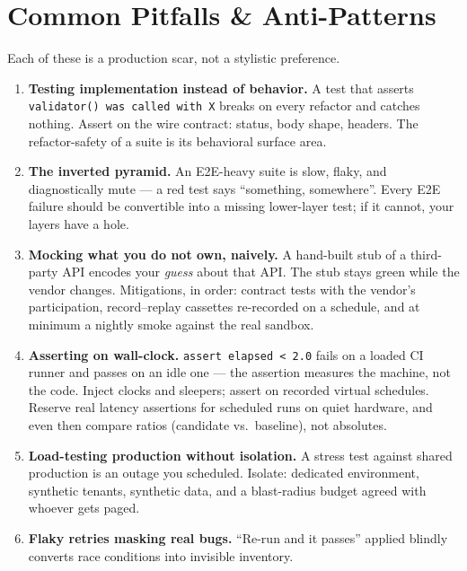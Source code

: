 \section{Common Pitfalls \& Anti-Patterns}
\label{sec:ch19-pitfalls}

Each of these is a production scar, not a stylistic preference.

\begin{enumerate}[label=\textbf{P-\arabic*.}, leftmargin=1.9cm]
  \item \textbf{Testing implementation instead of behavior.} A test that
        asserts \texttt{validator() was called with X} breaks on every
        refactor and catches nothing. Assert on the wire contract: status,
        body shape, headers. The refactor-safety of a suite is its
        behavioral surface area.
  \item \textbf{The inverted pyramid.} An E2E-heavy suite is slow, flaky,
        and diagnostically mute --- a red test says ``something, somewhere''.
        Every E2E failure should be convertible into a missing lower-layer
        test; if it cannot, your layers have a hole.
  \item \textbf{Mocking what you do not own, naively.} A hand-built stub of
        a third-party API encodes your \emph{guess} about that API. The
        stub stays green while the vendor changes. Mitigations, in order:
        contract tests with the vendor's participation, record--replay
        cassettes re-recorded on a schedule, and at minimum a nightly
        smoke against the real sandbox.
  \item \textbf{Asserting on wall-clock.} \texttt{assert elapsed < 2.0}
        fails on a loaded CI runner and passes on an idle one --- the
        assertion measures the machine, not the code. Inject clocks and
        sleepers; assert on recorded virtual schedules. Reserve real
        latency assertions for scheduled runs on quiet hardware, and even
        then compare ratios (candidate vs.\ baseline), not absolutes.
  \item \textbf{Load-testing production without isolation.} A stress test
        against shared production is an outage you scheduled. Isolate:
        dedicated environment, synthetic tenants, synthetic data, and a
        blast-radius budget agreed with whoever gets paged.
  \item \textbf{Flaky retries masking real bugs.} ``Re-run and it passes''
        applied blindly converts race conditions into invisible inventory.

\end{enumerate}
